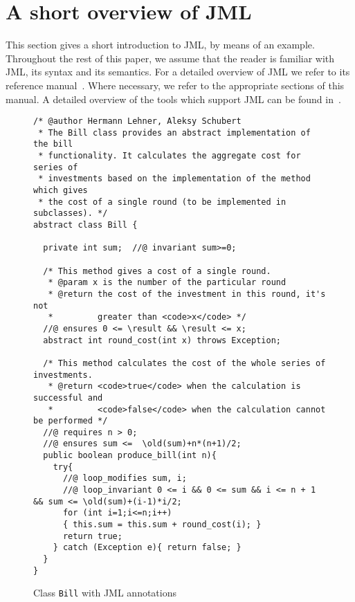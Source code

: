 \section{A short overview of JML}\label{SecJMLOverview}

This section gives a short introduction to JML, by means of an
example. Throughout the rest of this paper, we assume that the
reader is familiar with JML, its syntax and its semantics. For a
detailed overview of JML we refer to its reference
manual~\cite{JMLReferenceManual05}. Where necessary, we refer to the
appropriate sections of this manual. A detailed overview of the tools
which support JML can be found in~\cite{BurdyCCEKLLP05}.

\begin{figure}[th!]
{\small
\begin{verbatim}
/* @author Hermann Lehner, Aleksy Schubert
 * The Bill class provides an abstract implementation of the bill 
 * functionality. It calculates the aggregate cost for series of
 * investments based on the implementation of the method which gives 
 * the cost of a single round (to be implemented in subclasses). */
abstract class Bill {
  
  private int sum;  //@ invariant sum>=0;
 
  /* This method gives a cost of a single round.
   * @param x is the number of the particular round
   * @return the cost of the investment in this round, it's not
   *         greater than <code>x</code> */
  //@ ensures 0 <= \result && \result <= x;
  abstract int round_cost(int x) throws Exception;
  
  /* This method calculates the cost of the whole series of investments.
   * @return <code>true</code> when the calculation is successful and
   *         <code>false</code> when the calculation cannot be performed */
  //@ requires n > 0;
  //@ ensures sum <=  \old(sum)+n*(n+1)/2;
  public boolean produce_bill(int n){
    try{
      //@ loop_modifies sum, i;
      //@ loop_invariant 0 <= i && 0 <= sum && i <= n + 1 && sum <= \old(sum)+(i-1)*i/2;
      for (int i=1;i<=n;i++) 
      { this.sum = this.sum + round_cost(i); }
      return true;
    } catch (Exception e){ return false; }
  }
}
\end{verbatim}
}
\caption{Class \texttt{Bill} with JML annotations} 
\label{FigJMLSpec}
\end{figure}

